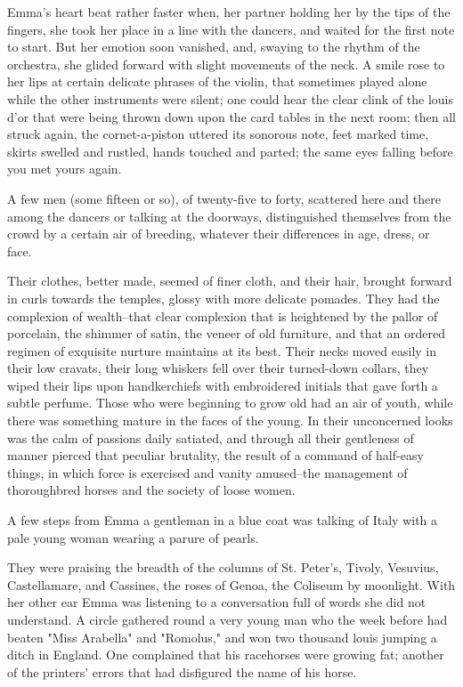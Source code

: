 \documentclass[11pt,twocolumn]{ltugboat}
\begin{document}
Emma's heart beat rather faster when, her partner holding her by the
tips of the fingers, she took her place in a line with the dancers, and
waited for the first note to start. But her emotion soon vanished, and,
swaying to the rhythm of the orchestra, she glided forward with slight
movements of the neck. A smile rose to her lips at certain delicate
phrases of the violin, that sometimes played alone while the other
instruments were silent; one could hear the clear clink of the louis
d'or that were being thrown down upon the card tables in the next room;
then all struck again, the cornet-a-piston uttered its sonorous note,
feet marked time, skirts swelled and rustled, hands touched and parted;
the same eyes falling before you met yours again.

A few men (some fifteen or so), of twenty-five to forty, scattered here
and there among the dancers or talking at the doorways, distinguished
themselves from the crowd by a certain air of breeding, whatever their
differences in age, dress, or face.

Their clothes, better made, seemed of finer cloth, and their hair,
brought forward in curls towards the temples, glossy with more delicate
pomades. They had the complexion of wealth--that clear complexion that
is heightened by the pallor of porcelain, the shimmer of satin, the
veneer of old furniture, and that an ordered regimen of exquisite
nurture maintains at its best. Their necks moved easily in their low
cravats, their long whiskers fell over their turned-down collars, they
wiped their lips upon handkerchiefs with embroidered initials that gave
forth a subtle perfume. Those who were beginning to grow old had an air
of youth, while there was something mature in the faces of the young.
In their unconcerned looks was the calm of passions daily satiated, and
through all their gentleness of manner pierced that peculiar brutality,
the result of a command of half-easy things, in which force is exercised
and vanity amused--the management of thoroughbred horses and the society
of loose women.

A few steps from Emma a gentleman in a blue coat was talking of Italy
with a pale young woman wearing a parure of pearls.

They were praising the breadth of the columns of St. Peter's, Tivoly,
Vesuvius, Castellamare, and Cassines, the roses of Genoa, the Coliseum
by moonlight. With her other ear Emma was listening to a conversation
full of words she did not understand. A circle gathered round a very
young man who the week before had beaten "Miss Arabella" and "Romolus,"
and won two thousand louis jumping a ditch in England. One complained
that his racehorses were growing fat; another of the printers' errors
that had disfigured the name of his horse.
\end{document}
